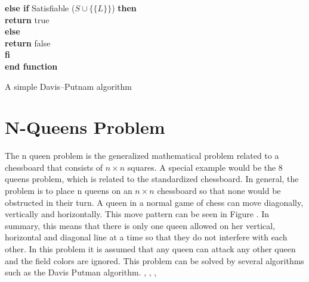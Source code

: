 \begin{listing}[h!]
    \hspace*{0.5cm} \textbf{else if} Satisfiable ($S \cup \{\{L\}\}$) \textbf{then}\\
      \hspace*{1.0cm} \textbf{return} true\\
    \hspace*{0.5cm} \textbf{else}\\
      \hspace*{1.0cm} \textbf{return} false\\
    \hspace*{0.5cm} \textbf{fi}\\
  \textbf{end function}
  \caption{A simple Davis–Putnam algorithm \cite{Zhang2000}}
  \label{listing:1}
\end{listing}  


\section{N-Queens Problem}
\label{sec:sciQueens}
The n queen problem is the generalized mathematical problem related to a chessboard that consists of $n \times n$ squares. A special example would be the 8 queens problem, which is related to the standardized chessboard. In general, the problem is to place n queens on an $n \times n$ chessboard so that none would be obstructed in their turn. A queen in a normal game of chess can move diagonally, vertically and horizontally. This move pattern can be seen in Figure \label{fig:queens-problem}. In summary, this means that there is only one queen allowed on her vertical, horizontal and diagonal line at a time so that they do not interfere with each other. In this problem it is assumed that any queen can attack any other queen and the field colors are ignored. This problem can be solved by several algorithms such as the Davis Putman algorithm. \cite{Bell2009}, \cite{Watkins2012}, \cite[146\psq]{Nudelman1995}, \cite{Stroetman2019}

